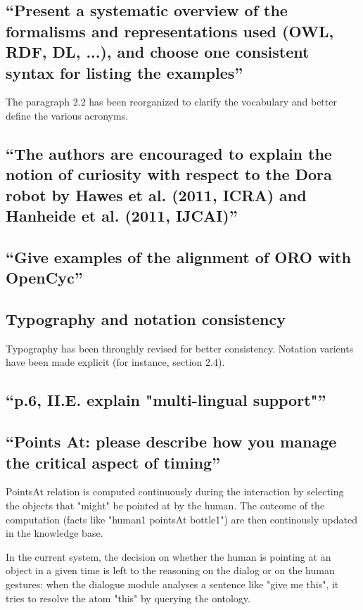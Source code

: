\documentclass{article}
\begin{document}
\subsection{``Present a systematic overview of the formalisms and
representations used (OWL, RDF, DL, ...), and choose one consistent syntax for
listing the examples''}

The paragraph 2.2 has been reorganized to clarify the vocabulary and better
define the various acronyms.

\subsection{``The authors are encouraged to explain the notion of curiosity
with respect to the Dora robot by Hawes et al. (2011, ICRA) and Hanheide et al.
(2011, IJCAI)''}

\subsection{``Give examples of the alignment of ORO with OpenCyc''}

\subsection{Typography and notation consistency}

Typography has been throughly revised for better consistency. Notation varients have been
made explicit (for instance, section 2.4).

\subsection{``p.6, II.E. explain "multi-lingual support"''}


\subsection{``Points At: please describe how you manage the critical aspect of
timing''}

PointsAt relation is computed continuously during the interaction by 
selecting the objects that "might" be pointed at by the human. The outcome
of the computation (facts like "human1 pointsAt bottle1") are then
continously updated in the knowledge base.

In the current system, the decision on whether the human is pointing at an 
object in a given time is left to the reasoning on the dialog or on the human gestures:
when the dialogue module analyses a sentence like "give me this", it tries to
resolve the atom "this" by querying the ontology.
\end{document}
